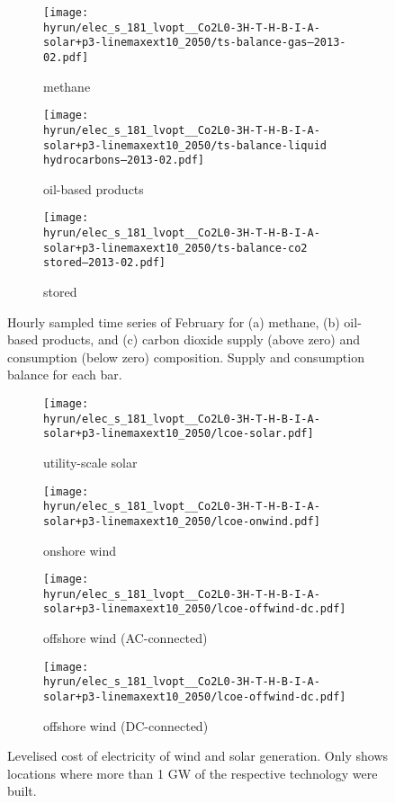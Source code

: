\begin{figure}
    \centering

    \begin{subfigure}[t]{\textwidth}
        \centering
        \caption{methane}
        \texttt{[image: \\hyrun/elec\_s\_181\_lvopt\_\_Co2L0-3H-T-H-B-I-A-solar+p3-linemaxext10\_2050/ts-balance-gas--2013-02.pdf]}
    \end{subfigure}
    \begin{subfigure}[t]{\textwidth}
        \centering
        \caption{oil-based products}
        \texttt{[image: \\hyrun/elec\_s\_181\_lvopt\_\_Co2L0-3H-T-H-B-I-A-solar+p3-linemaxext10\_2050/ts-balance-liquid hydrocarbons--2013-02.pdf]}
    \end{subfigure}
    \begin{subfigure}[t]{\textwidth}
        \centering
        \caption{stored \co}
        \texttt{[image: \\hyrun/elec\_s\_181\_lvopt\_\_Co2L0-3H-T-H-B-I-A-solar+p3-linemaxext10\_2050/ts-balance-co2 stored--2013-02.pdf]}
    \end{subfigure}

    \caption{Hourly sampled time series of February for (a) methane, (b) oil-based products, and (c) carbon dioxide supply (above zero) and consumption (below zero) composition. Supply and consumption balance for each bar.}
    \label{fig:output-ts-4}
\end{figure}

\begin{figure}
    \begin{subfigure}{0.49\textwidth}
        \centering
        \caption{utility-scale solar}
        \texttt{[image: \\hyrun/elec\_s\_181\_lvopt\_\_Co2L0-3H-T-H-B-I-A-solar+p3-linemaxext10\_2050/lcoe-solar.pdf]}
    \end{subfigure}
    \begin{subfigure}{0.49\textwidth}
        \centering
        \caption{onshore wind}
        \texttt{[image: \\hyrun/elec\_s\_181\_lvopt\_\_Co2L0-3H-T-H-B-I-A-solar+p3-linemaxext10\_2050/lcoe-onwind.pdf]}
    \end{subfigure}
    \begin{subfigure}{0.49\textwidth}
        \centering
        \caption{offshore wind (AC-connected)}
        \texttt{[image: \\hyrun/elec\_s\_181\_lvopt\_\_Co2L0-3H-T-H-B-I-A-solar+p3-linemaxext10\_2050/lcoe-offwind-dc.pdf]}
    \end{subfigure}
    \begin{subfigure}{0.49\textwidth}
        \centering
        \caption{offshore wind (DC-connected)}
        \texttt{[image: \\hyrun/elec\_s\_181\_lvopt\_\_Co2L0-3H-T-H-B-I-A-solar+p3-linemaxext10\_2050/lcoe-offwind-dc.pdf]}
    \end{subfigure}
    \caption{Levelised cost of electricity of wind and solar generation. Only shows locations where more than 1 GW of the respective technology were built.}
    \label{fig:si:lcoe}
\end{figure}

